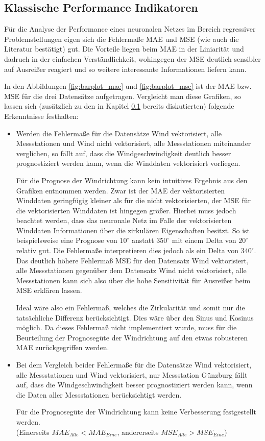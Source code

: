 \documentclass[
12pt, %
toc=listofnumbered, %
toc=chapterentrydotfill, %
numbers=noenddot, %
captions=tableheading, %
bibliography=numbered
]{scrreprt}
\let\Oldsubsection\subsection
\renewcommand{\subsection}{\FloatBarrier\Oldsubsection}
\newcommand{\qm}[1]{\glqq#1\grqq{}} %
\begin{document}
\subsection{Klassische Performance Indikatoren}\label{section:klassische_perf_indi}
Für die Analyse der Performance eines neuronalen Netzes im Bereich regressiver Problemstellungen eigen sich die Fehlermaße MAE und MSE (wie auch die Literatur bestätigt) gut. Die Vorteile liegen beim MAE in der Liniarität und dadruch in der einfachen Verständlichkeit, wohingegen der MSE deutlich sensibler auf Ausreißer reagiert und so weitere interessante Informationen liefern kann.

In den Abbildungen \ref{fig:barplot_mae} und \ref{fig:barplot_mse} ist der MAE bzw. MSE für die drei Datensätze aufgetragen. Vergleicht man diese Grafiken, so lassen sich (zusätzlich zu den in Kapitel \ref{section:klassische_perf_indi} bereits diskutierten) folgende Erkenntnisse festhalten:

\begin{itemize}
	\item Werden die Fehlermaße für die Datensätze \qm{Wind vektorisiert, alle Messstationen} und \qm{Wind nicht vektorisiert, alle Messstationen} miteinander verglichen, so fällt auf, dass die Windgeschwindigkeit deutlich besser prognostiziert werden kann, wenn die Winddaten vektorisiert vorliegen. 
	
	Für die Prognose der Windrichtung kann kein intuitives Ergebnis aus den Grafiken entnommen werden. Zwar ist der MAE der vektorisierten Winddaten geringfügig kleiner als für die nicht vektorisierten, der MSE für die vektorisierten Winddaten ist hingegen größer. Hierbei muss jedoch beachtet werden, dass das neuronale Netz im Falle der vektorisierten Winddaten Informationen über die zirkulären Eigenschaften besitzt. So ist beispielsweise eine Prognose von $10^\circ$ anstatt $350^\circ$ mit einem Delta von $20^\circ$ relativ gut. Die Fehlermaße interpretieren dies jedoch als ein Delta von $340^\circ$. Das deutlich höhere Fehlermaß MSE für den Datensatz \qm{Wind vektorisiert, alle Messstationen} gegenüber dem Datensatz \qm{Wind nicht vektorisiert, alle Messstationen} kann sich also über die hohe Sensitivität für Ausreißer beim MSE erklären lassen.

	Ideal wäre also ein Fehlermaß, welches die Zirkularität und somit nur die tatsächliche Differenz berücksichtigt. Dies wäre über den Sinus und Kosinus möglich. Da dieses Fehlermaß nicht implementiert wurde, muss für die Beurteilung der Prognosegüte der Windrichtung auf den etwas robusteren MAE zurückgegriffen werden.

	\item Bei dem Vergleich beider Fehlermaße für die Datensätze \qm{Wind vektorisiert, alle Messstationen} und \qm{Wind vektorisiert, nur Messstation Günzburg} fällt auf, dass die Windgeschwindigkeit besser prognostiziert werden kann, wenn die Daten aller Messstationen berücksichtigt werden. 
	
	Für die Prognosegüte der Windrichtung kann keine Verbesserung festgestellt werden.\\
	(Einerseits $MAE_{Alle} < MAE_{Eine}$, andererseits $MSE_{Alle} > MSE_{Eine}$)
\end{itemize}
\end{document}
